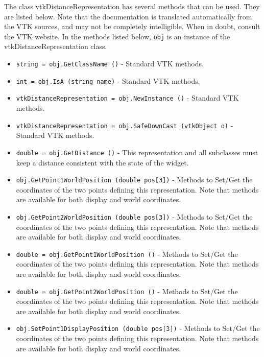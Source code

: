 The class vtkDistanceRepresentation has several methods that can be used.
  They are listed below.
Note that the documentation is translated automatically from the VTK sources,
and may not be completely intelligible.  When in doubt, consult the VTK website.
In the methods listed below, \verb|obj| is an instance of the vtkDistanceRepresentation class.
\begin{itemize}
\item  \verb|string = obj.GetClassName ()| -  Standard VTK methods.

\item  \verb|int = obj.IsA (string name)| -  Standard VTK methods.

\item  \verb|vtkDistanceRepresentation = obj.NewInstance ()| -  Standard VTK methods.

\item  \verb|vtkDistanceRepresentation = obj.SafeDownCast (vtkObject o)| -  Standard VTK methods.

\item  \verb|double = obj.GetDistance ()| -  This representation and all subclasses must keep a distance
 consistent with the state of the widget.

\item  \verb|obj.GetPoint1WorldPosition (double pos[3])| -  Methods to Set/Get the coordinates of the two points defining
 this representation. Note that methods are available for both
 display and world coordinates.

\item  \verb|obj.GetPoint2WorldPosition (double pos[3])| -  Methods to Set/Get the coordinates of the two points defining
 this representation. Note that methods are available for both
 display and world coordinates.

\item  \verb|double = obj.GetPoint1WorldPosition ()| -  Methods to Set/Get the coordinates of the two points defining
 this representation. Note that methods are available for both
 display and world coordinates.

\item  \verb|double = obj.GetPoint2WorldPosition ()| -  Methods to Set/Get the coordinates of the two points defining
 this representation. Note that methods are available for both
 display and world coordinates.

\item  \verb|obj.SetPoint1DisplayPosition (double pos[3])| -  Methods to Set/Get the coordinates of the two points defining
 this representation. Note that methods are available for both
 display and world coordinates.


\end{itemize}
